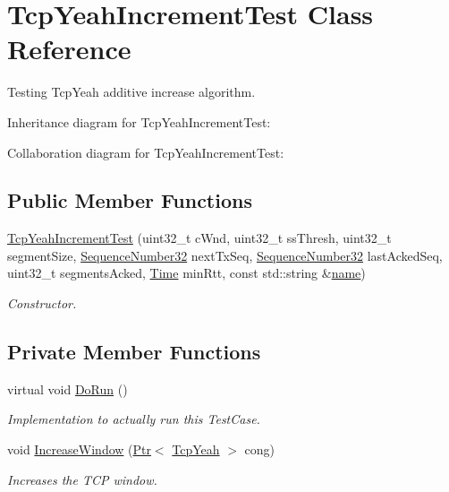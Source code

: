 \hypertarget{classTcpYeahIncrementTest}{}\section{Tcp\+Yeah\+Increment\+Test Class Reference}
\label{classTcpYeahIncrementTest}


Testing Tcp\+Yeah additive increase algorithm.  




Inheritance diagram for Tcp\+Yeah\+Increment\+Test\+:


Collaboration diagram for Tcp\+Yeah\+Increment\+Test\+:
\subsection*{Public Member Functions}
\begin{DoxyCompactItemize}
\item 
\hyperlink{classTcpYeahIncrementTest_a6e0a7695f249320119b1e0882e2833bc}{Tcp\+Yeah\+Increment\+Test} (uint32\+\_\+t c\+Wnd, uint32\+\_\+t ss\+Thresh, uint32\+\_\+t segment\+Size, \hyperlink{group__network_gacb2070e4e98d2d5135c9bede58f07a03}{Sequence\+Number32} next\+Tx\+Seq, \hyperlink{group__network_gacb2070e4e98d2d5135c9bede58f07a03}{Sequence\+Number32} last\+Acked\+Seq, uint32\+\_\+t segments\+Acked, \hyperlink{classns3_1_1Time}{Time} min\+Rtt, const std\+::string \&\hyperlink{generate__test__data__lte__spectrum__model_8m_ab74e6bf80237ddc4109968cedc58c151}{name})
\begin{DoxyCompactList}\small\item\em Constructor. \end{DoxyCompactList}\end{DoxyCompactItemize}
\subsection*{Private Member Functions}
\begin{DoxyCompactItemize}
\item 
virtual void \hyperlink{classTcpYeahIncrementTest_a8100d996b7210a1476e34eed2781800a}{Do\+Run} ()
\begin{DoxyCompactList}\small\item\em Implementation to actually run this Test\+Case. \end{DoxyCompactList}\item 
void \hyperlink{classTcpYeahIncrementTest_a09968ca2fd878753b5cf736c1d918076}{Increase\+Window} (\hyperlink{classns3_1_1Ptr}{Ptr}$<$ \hyperlink{classns3_1_1TcpYeah}{Tcp\+Yeah} $>$ cong)
\begin{DoxyCompactList}\small\item\em Increases the T\+CP window. \end{DoxyCompactList}\end{DoxyCompactItemize}
